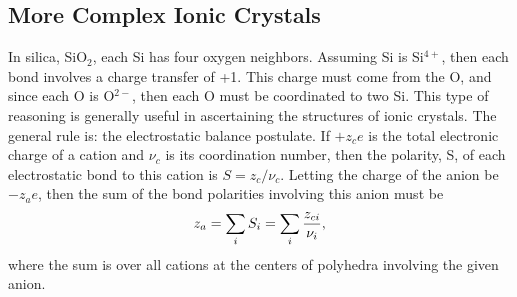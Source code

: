 \subsection{More Complex Ionic Crystals}

In silica, SiO$_2$, each Si has four oxygen neighbors.  Assuming Si is
Si$^{4+}$, then each bond involves a charge transfer of +1.  This
charge must come from the O, and since each O is O$^{2-}$, then each O
must be coordinated to two Si. This type of reasoning is generally
useful in ascertaining the structures of ionic crystals.  The general
rule is: the electrostatic balance postulate.  If $+z_ce$ is the total
electronic charge of a cation and $\nu_c$ is its coordination number,
then the polarity, S, of each electrostatic bond to this cation is $S=
z_c/\nu_c$.  Letting the charge of the anion be $-z_ae$, then the sum
of the bond polarities involving this anion must be
$$
z_a = \sum_{i} S_i = \sum_{i} {z_{ci} \over \nu_i},
$$
where the sum is over all cations at the centers of polyhedra involving the 
given anion.

